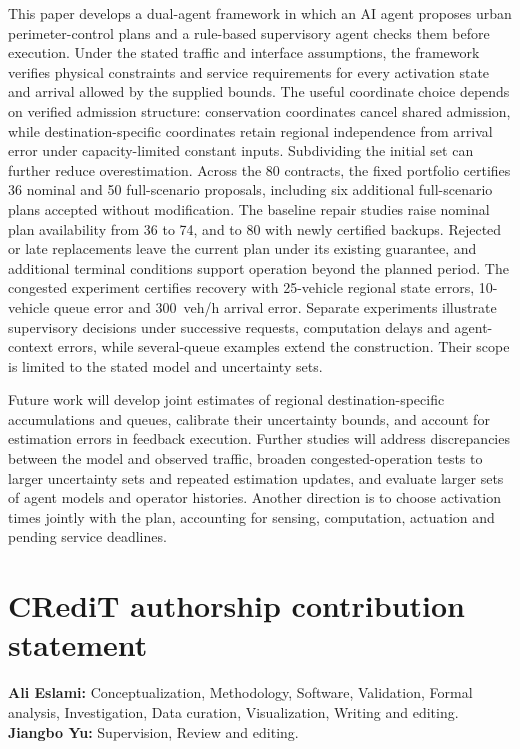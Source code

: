 \documentclass[preprint,12pt]{elsarticle}
\theoremstyle{definition}
\theoremstyle{plain}
\theoremstyle{definition}
\theoremstyle{plain}
\begin{document}
This paper develops a dual-agent framework in which an AI agent proposes
urban perimeter-control plans and a rule-based supervisory agent checks
them before execution. Under the stated traffic and interface assumptions,
the framework verifies physical constraints and service requirements for
every activation state and arrival allowed by the supplied bounds. The useful coordinate choice depends on verified admission structure:
conservation coordinates cancel shared admission, while destination-specific
coordinates retain regional independence from arrival error under
capacity-limited constant inputs. Subdividing the initial set can further
reduce overestimation. Across the 80 contracts, the fixed portfolio certifies 36 nominal and
50 full-scenario proposals, including six additional full-scenario plans
accepted without modification. The baseline repair studies raise nominal
plan availability from 36 to 74, and to 80 with newly certified backups. Rejected or late replacements leave the current plan
under its existing guarantee, and additional terminal conditions support
operation beyond the planned period. The congested experiment certifies recovery with 25-vehicle regional
state errors, 10-vehicle queue error and 300~veh/h arrival error.
Separate experiments illustrate supervisory decisions under successive
requests, computation delays and agent-context errors, while several-queue
examples extend the construction. Their scope is limited
to the stated model and uncertainty sets.

Future work will develop joint estimates of regional destination-specific accumulations
and queues, calibrate their uncertainty bounds, and account for estimation
errors in feedback execution. Further studies will address discrepancies
between the model and observed traffic, broaden congested-operation
tests to larger uncertainty sets and repeated estimation updates, and
evaluate larger sets of agent models and operator histories. Another
direction is to choose activation times jointly with the plan, accounting
for sensing, computation, actuation and pending service deadlines.

\section*{CRediT authorship contribution statement}
\textbf{Ali Eslami:} Conceptualization, Methodology, Software, Validation,
Formal analysis, Investigation, Data curation, Visualization,
Writing and editing.
\textbf{Jiangbo Yu:} Supervision, Review and editing.
\end{document}
